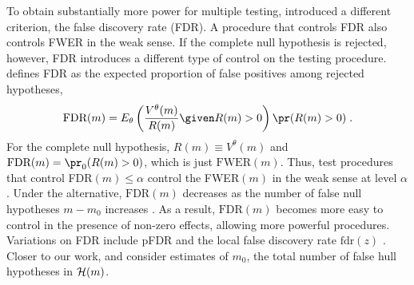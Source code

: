 \documentclass[12pt]{article}
\begin{document}
To obtain substantially more power for multiple testing,
\citet{benjamini95} introduced a different criterion, the false
discovery rate (FDR).  A procedure that controls FDR also controls
FWER in the weak sense.  If the complete null hypothesis is rejected,
however, FDR introduces a different type of control on the testing
procedure.  \citet{benjamini95} defines FDR as the expected proportion
of false positives among rejected hypotheses,
\begin{equation}
  \mbox{FDR}(m) = E_\theta \left(\frac{V^\theta(m)}{R(m)} \given R(m)>0 \right)
               \pr (R(m)>0)  \;.
\label{eq:fdr}
\end{equation}
For the complete null hypothesis, $R(m) \equiv V^\theta(m)$ and
$\mbox{FDR}(m) = \pr_0(R(m)>0)$, which is just $\mbox{FWER}(m)$.
Thus, test procedures that control FDR$(m) \le \alpha$ control the
FWER$(m)$ in the weak sense at level $\alpha$.  Under the alternative,
$\mbox{FDR}(m)$ decreases as the number of false null hypotheses
$m-m_0$ increases \citep{shaffer03}.  As a result, $\mbox{FDR}(m)$
becomes more easy to control in the presence of non-zero effects,
allowing more powerful procedures.  Variations on FDR include pFDR
\citep[which drops the term $\pr (R>0)$][]{storey02,storey03} and the
local false discovery rate $\mbox{fdr}(z)$ \citep[which estimates the
  false discovery rate as a function of the size of the test
  statistic][]{efron04, efron05}.  Closer to our work,
\citet{rice06} and \citet{meinshausen04b} consider estimates
of $m_0$, the total number of false hull hypotheses in ${\cal H}(m)$.
\end{document}
